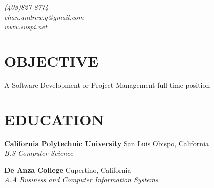 \documentclass[margin,line]{resume}
\begin{document}
\fontsize{9.5pt}{9.5pt}\selectfont
\def \identsize {12mm}

{
	\sc
    \hfill {\infosize\textsl{(408)827-8774}}                  \vspace{0mm}\\\vspace{0mm}%
    \hfill {\infosize\textsl{chan.andrew.g@gmail.com}}            \vspace{0mm}\\\vspace{0mm}%
    \hfill {\infosize\textsl{www.suspi.net}}             \vspace{0mm}\\\vspace{-10mm}%
}

\begin{resume}

\vspace{1mm}

    \section{\mysidestyle \textbf{\large{O}\small{BJECTIVE}}}

		A Software Development or Project Management full-time position

\sectionline

    \section{\mysidestyle \textbf{\large{E}\small{DUCATION}}}

    \textbf{\listing California Polytechnic University} \hfill San Luis Obispo, California\\
    \hspace*{\identsize} \textsl{B.S Computer Science} \vspace{-2.5mm}
    
		\textbf{\listing De Anza College} \hfill Cupertino, California\\
    \hspace*{\identsize} \textsl{A.A Business and Computer Information Systems}

\sectionline



\end{resume}
\end{document}
